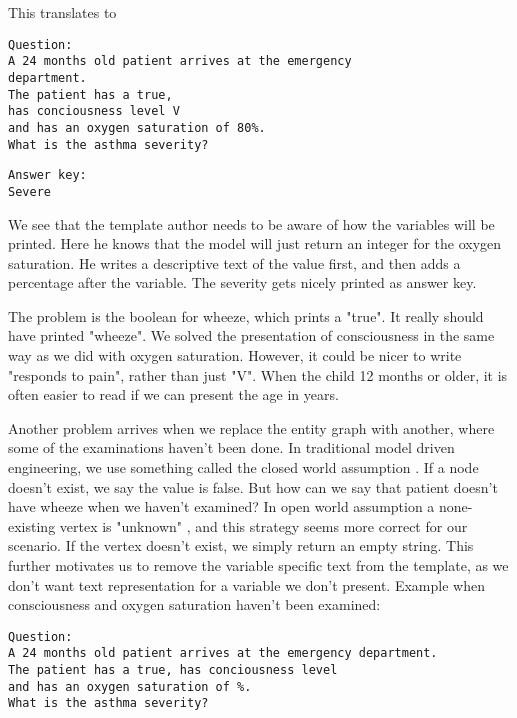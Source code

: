 This translates to 
\begin{lstlisting}[caption={Question instantiation}, frame=single] 
Question:
A 24 months old patient arrives at the emergency 
department. 
The patient has a true,
has conciousness level V 
and has an oxygen saturation of 80%. 
What is the asthma severity? 
\end{lstlisting}
 \begin{lstlisting}[caption={Answer key template}, frame=single] 
Answer key:
Severe
\end{lstlisting}

We see that the template author needs to be aware of how the variables will be printed. Here he knows that the model will just return an integer for the oxygen saturation. He writes a descriptive text of the value first, and then adds a percentage after the variable. The severity gets nicely printed as answer key.

The problem is the boolean for wheeze, which prints a "true". It really should have printed "wheeze". We solved the presentation of consciousness in the same way as we did with oxygen saturation. However, it could be nicer to write "responds to pain", rather than just "V". When the child 12 months or older, it is often easier to read if we can present the age in years.

Another problem arrives when we replace the entity graph with another, where some of the examinations haven't been done. In traditional model driven engineering, we use something called the closed world assumption \parencite{Sadowska2019}. If a node doesn't exist, we say the value is false. But how can we say that patient doesn't have wheeze when we haven't examined? In open world assumption a none-existing vertex is "unknown" \parencite{Patel-Schneider2006} \parencite{Bergman2018}, and this strategy seems more correct for our scenario. If the vertex doesn't exist, we simply return an empty string. This further motivates us to remove the variable specific text from the template, as we don't want text representation for a variable we don't present. Example when consciousness and oxygen saturation haven't been examined:

\begin{lstlisting}[caption={Question instantiation}, frame=single] 
Question:
A 24 months old patient arrives at the emergency department. 
The patient has a true, has conciousness level 
and has an oxygen saturation of %. 
What is the asthma severity? 
\end{lstlisting}

